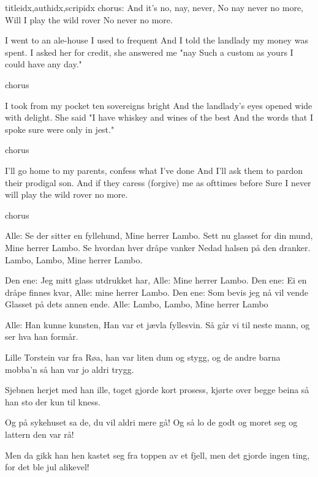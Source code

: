 \documentclass[14pt,letterpaper,norsk]{article}
\begin{document}
\begin{songs}{titleidx,authidx,scripidx}
\beginchorus
chorus: And it's no, nay, never, 
No nay never no more, 
Will I play the wild rover 
No never no more.
\endchorus

\beginverse
I went to an ale-house I used to frequent 
And I told the landlady my money was spent. 
I asked her for credit, she answered me "nay 
Such a custom as yours I could have any day." 
\endverse

\beginchorus
chorus
\endchorus

\beginverse
I took from my pocket ten sovereigns bright 
And the landlady's eyes opened wide with delight. 
She said "I have whiskey and wines of the best 
And the words that I spoke sure were only in jest." 
\endverse

\beginchorus
chorus 
\endchorus

\beginverse
I'll go home to my parents, confess what I've done 
And I'll ask them to pardon their prodigal son. 
And if they caress (forgive) me as ofttimes before 
Sure I never will play the wild rover no more. 
\endverse

\beginchorus
chorus
\endchorus
\endsong

\beginverse
Alle: Se der sitter en fyllehund,
Mine herrer Lambo.
Sett nu glasset for din mund,
Mine herrer Lambo.
Se hvordan hver dråpe vanker
Nedad halsen på den dranker.
Lambo, Lambo,
Mine herrer Lambo.
\endverse

\beginverse
Den ene: Jeg mitt glass utdrukket har,
Alle: Mine herrer Lambo.
Den ene: Ei en dråpe finnes kvar,
Alle: mine herrer Lambo.
Den ene: Som bevis jeg nå vil vende
Glasset på dets annen ende.
Alle: Lambo, Lambo,
Mine herrer Lambo
\endverse

\beginverse
Alle: Han kunne kunsten,
Han var et jævla fyllesvin.
Så går vi til neste mann, og
ser hva han formår.
\endverse
\endsong


\beginverse
Lille Torstein var fra Røa,
han var liten dum og stygg,
og de andre barna mobba'n så
han var jo aldri trygg.
\endverse

\beginverse
Sjebnen herjet med han ille,
toget gjorde kort prosess,
kjørte over begge beina
så han sto der kun til kness.
\endverse

\beginverse
Og på sykehuset sa de,
du vil aldri mere gå!
Og så lo de godt og moret seg
og lattern den var rå!
\endverse

\beginverse
Men da gikk han hen kastet seg
fra toppen av et fjell,
men det gjorde ingen ting,
for det ble jul alikevel!
\endverse
\endsong


\end{songs}
\end{document}
